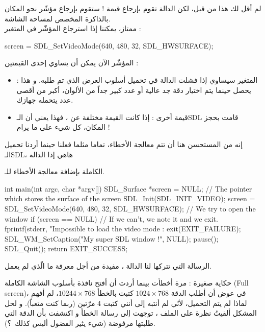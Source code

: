 لم أقل لك هذا من قبل، لكن الدالة
تقوم بإرجاع قيمة ! ستقوم بإرجاع مؤشّر نحو المكان بالذاكرة المخصص لمساحة الشاشة.\\
ممتاز، يمكننا إذا استرجاع المؤشّر في المتغير 
 :

\begin{Csource}
screen = SDL_SetVideoMode(640, 480, 32, SDL_HWSURFACE);
\end{Csource}

المؤشّر الآن يمكن أن يساوي إحدى القيمتين :

\begin{itemize}
	\item {} :
	المتغير 
	سيساوي
	إذا فشلت الدالة
	في تحميل أسلوب العرض الذي تم طلبه. و هذا يحصل حينما يتم اختيار دقة جد عالية أو عدد كبير جداً من الألوان، أكبر من أقصى عدد يتحمله جهازك.
	\item قيمة أخرى : إذا كانت القيمة مختلفة عن 
	،
	فهذا يعني أن الـ\textenglish{SDL}
	قامت بحجز المكان، كل شيء على ما يرام !
\end{itemize}

إنه من المستحسن هنا أن تتم معالجة الأخطاء، تماما مثلما فعلنا حينما أردنا تحميل الـ\textenglish{SDL}،
هاهي إذا الدالة

الكاملة بإضافة معالجة الأخطاء للـ.

\begin{Csource}
int main(int argc, char *argv[])
{
	SDL_Surface *screen = NULL; // The pointer which stores the surface of the screen
	SDL_Init(SDL_INIT_VIDEO);
	screen = SDL_SetVideoMode(640, 480, 32, SDL_HWSURFACE); // We try to open the window
	if (screen  == NULL) // If we can't, we note it and we exit.
	{
		fprintf(stderr, "Impossible to load the video mode : %
		exit(EXIT_FAILURE);
	}
	SDL_WM_SetCaption("My super SDL window !", NULL);
	pause();
	SDL_Quit();
	return EXIT_SUCCESS;
}
\end{Csource}

الرسالة التي تتركها لنا الدالة
،
مفيدة من أجل معرفة ما الّذي لم يعمل.

\begin{information}
حكاية صغيرة : مرة أخطأت بينما أردت أن أفتح نافذة بأسلوب الشاشة الكاملة 
(\textenglish{Full screen})،
في عوض أن أطلب الدقة
$1024 \times 768$
كتبت بالخطأ 
$10244 \times 768$،
لم أفهم لماذا لم يتم التحميل، لأنّي لم أنتبه إلى أنني كتبت 4 مرّتين (ربما كنت متعباً). و لحل المشكل ألقيتُ نظرة على الملف 
،
توجهت إلى رسالة الخطأ و اكتشفت بأن الدقة التي طلبتها مرفوضة (شيء يثير الفضول أليس كذلك~؟).
\end{information}

